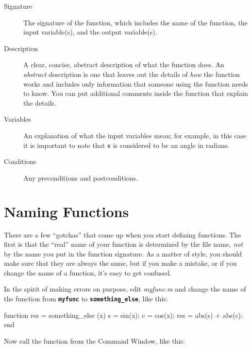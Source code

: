 \begin{description}

\item [Signature] The signature of the function, which includes the name
of the function, the input variable(s), and the output variable(s).

\item [Description] A clear, concise, abstract description of what the function does.
An \emph{abstract} description is one that leaves out the
details of \emph{how} the function works and includes only information
that someone  using the function needs to know.  You can put additional
comments inside the function that explain the details.

\item [Variables] An explanation of what the input variables mean; for example,
in this case it is important to note that \lstinline{x} is considered
to be an angle in radians.

\item [Conditions] Any preconditions and postconditions.

\end{description}


\section{Naming Functions}

There are a few ``gotchas'' that come up when you start defining functions.
The first is that the ``real'' name of your function is determined by the file name, \emph{not} by the name you put in the function signature.  As a matter of style, you
should make sure that they are always the same, but if you
make a mistake, or if you change the name of a function, it's
easy to get confused.


In the spirit of making errors on purpose, edit \emph{myfunc.m} and change the name of the function from \textbf{\lstinline{myfunc}} to \textbf{\lstinline{something_else}}, like this:

\begin{code}
function res = something_else (x)
    s = sin(x);
    c = cos(x);
    res = abs(s) + abs(c);
end
\end{code}

Now call the function from the Command Window, like this:

